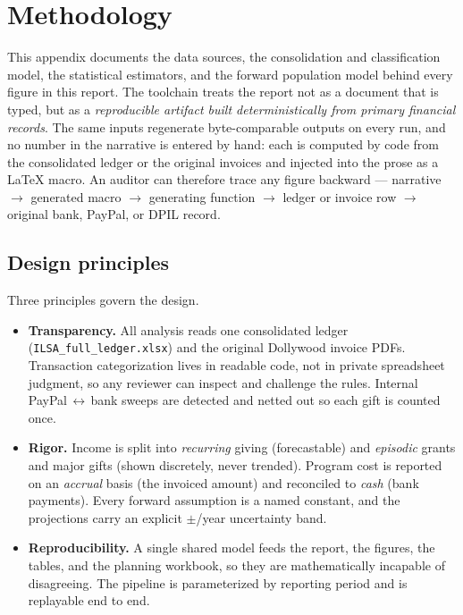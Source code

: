 \chapter{Methodology}
\label{app:methodology}

This appendix documents the data sources, the consolidation and classification
model, the statistical estimators, and the forward population model behind every
figure in this report. The toolchain treats the report not as a document that is
typed, but as a \emph{reproducible artifact built deterministically from primary
financial records}. The same inputs regenerate byte-comparable outputs on every
run, and no number in the narrative is entered by hand: each is computed by code
from the consolidated ledger or the original invoices and injected into the prose
as a \LaTeX{} macro. An auditor can therefore trace any figure backward ---
narrative $\rightarrow$ generated macro $\rightarrow$ generating function
$\rightarrow$ ledger or invoice row $\rightarrow$ original bank, PayPal, or DPIL
record.

\section{Design principles}

Three principles govern the design.

\begin{itemize}
  \item \textbf{Transparency.} All analysis reads one consolidated ledger
        (\texttt{ILSA\_full\_ledger.xlsx}) and the original Dollywood invoice
        PDFs. Transaction categorization lives in readable code, not in private
        spreadsheet judgment, so any reviewer can inspect and challenge the rules.
        Internal PayPal\,$\leftrightarrow$\,bank sweeps are detected and netted out
        so each gift is counted once.
  \item \textbf{Rigor.} Income is split into \emph{recurring} giving
        (forecastable) and \emph{episodic} grants and major gifts (shown discretely,
        never trended). Program cost is reported on an \emph{accrual} basis (the
        invoiced amount) and reconciled to \emph{cash} (bank payments). Every
        forward assumption is a named constant, and the projections carry an
        explicit $\pm$\ilsaScenBand{}/year uncertainty band.
  \item \textbf{Reproducibility.} A single shared model feeds the report, the
        figures, the tables, and the planning workbook, so they are mathematically
        incapable of disagreeing. The pipeline is parameterized by reporting period
        and is replayable end to end.
\end{itemize}

